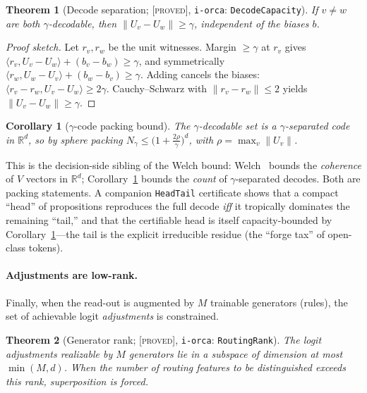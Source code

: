 \documentclass[sigconf,nonacm]{acmart}
\newtheorem{theorem}{Theorem}
\newtheorem{corollary}{Corollary}
\theoremstyle{definition}
\newcommand{\R}{\mathbb{R}}
\newcommand{\inner}[2]{\langle #1, #2\rangle}
\newcommand{\Uv}{U_v}
\newcommand{\proved}{\textsc{[proved]}}
\begin{document}
\begin{theorem}[Decode separation; \proved, \texttt{i-orca}: \texttt{DecodeCapacity}]
\label{thm:sep}
If $v\ne w$ are both $\gamma$-decodable, then $\|\Uv-U_w\|\ge\gamma$,
\emph{independent of the biases} $b$.
\end{theorem}

\begin{proof}[Proof sketch]
Let $r_v,r_w$ be the unit witnesses. Margin $\ge\gamma$ at $r_v$ gives
$\inner{r_v}{\Uv-U_w}+(b_v-b_w)\ge\gamma$, and symmetrically
$\inner{r_w}{U_w-\Uv}+(b_w-b_v)\ge\gamma$. Adding cancels the biases:
$\inner{r_v-r_w}{\Uv-U_w}\ge2\gamma$. Cauchy--Schwarz with
$\|r_v-r_w\|\le2$ yields $\|\Uv-U_w\|\ge\gamma$.
\end{proof}

\begin{corollary}[$\gamma$-code packing bound]
\label{cor:packing}
The $\gamma$-decodable set is a $\gamma$-separated code in $\R^d$, so by sphere
packing
$N_\gamma\le\bigl(1+\tfrac{2\rho}{\gamma}\bigr)^{d}$, with $\rho=\max_v\|\Uv\|$.
\end{corollary}

This is the decision-side sibling of the Welch bound: Welch~\cite{welch1974lower}
bounds the \emph{coherence} of $V$ vectors in $\R^d$; Corollary~\ref{cor:packing}
bounds the \emph{count} of $\gamma$-separated decodes. Both are packing statements.
A companion \texttt{HeadTail} certificate shows that a compact ``head'' of
propositions reproduces the full decode \emph{iff} it tropically dominates the
remaining ``tail,'' and that the certifiable head is itself capacity-bounded by
Corollary~\ref{cor:packing}---the tail is the explicit irreducible residue (the
``forge tax'' of open-class tokens).

\paragraph{Adjustments are low-rank.}
Finally, when the read-out is augmented by $M$ trainable generators (rules), the set
of achievable logit \emph{adjustments} is constrained.

\begin{theorem}[Generator rank; \proved, \texttt{i-orca}: \texttt{RoutingRank}]
\label{thm:rank}
The logit adjustments realizable by $M$ generators lie in a subspace of dimension at
most $\min(M,d)$. When the number of routing features to be distinguished exceeds
this rank, superposition is forced.
\end{theorem}
\end{document}
